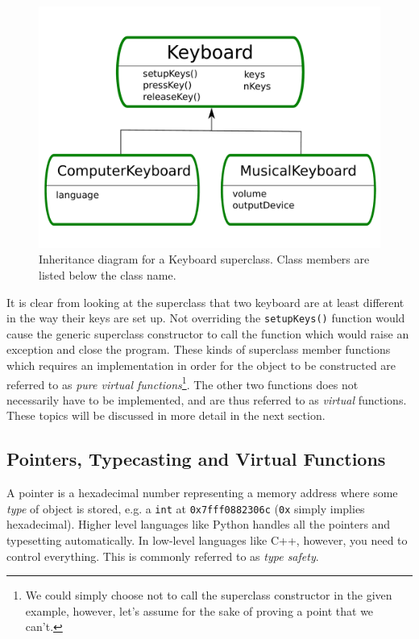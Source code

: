 \begin{figure}[h]
 \begin{center}
  \includegraphics[scale=0.35]{../Graphics/UMLkeyboard.pdf}
  \caption{Inheritance diagram for a Keyboard superclass. Class members are listed below the class name.}
  \label{fig:UMLkeyboard}
 \end{center}
\end{figure}

\clearpage


It is clear from looking at the superclass that two keyboard are at least different in the way their keys are set up. Not overriding the \verb+setupKeys()+ function would cause the generic superclass constructor to call the function which would raise an exception and close the program. These kinds of superclass member functions which requires an implementation in order for the object to be constructed are referred to as \textit{pure virtual functions}\footnote{We could simply choose not to call the superclass constructor in the given example, however, let's assume for the sake of proving a point that we can't.}. The other two functions does not necessarily have to be implemented, and are thus referred to as \textit{virtual} functions. These topics will be discussed in more detail in the next section.

\subsection{Pointers, Typecasting and Virtual Functions}

A pointer is a hexadecimal number representing a memory address where some \textit{type} of object is stored, e.g. a \verb+int+ at \verb+0x7fff0882306c+ (\verb+0x+ simply implies hexadecimal). Higher level languages like Python handles all the pointers and typesetting automatically. In low-level languages like C++, however, you need to control everything. This is commonly referred to as \textit{type safety}. 

